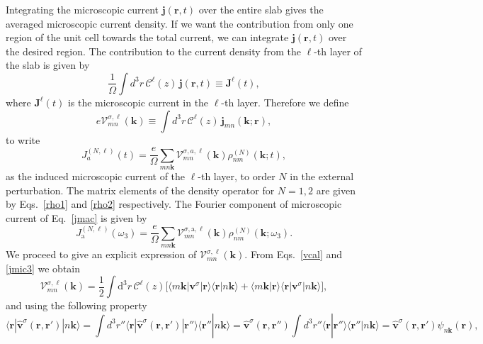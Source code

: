 Integrating the microscopic current $\mathbf{j}(\mathbf{r},t)$ over
the entire slab gives the averaged microscopic current density. 
If we want the contribution from only one region of the unit cell 
towards the total current, we can integrate $\mathbf{j}({\mathbf r},t)$ 
over the desired region. The contribution to the current density from the
$\ell$-th layer of the slab is given by
\begin{equation}\label{jsz}
\frac{1}{\Omega}\int d^3r\, \mathcal{C}^{\ell}(z)\, \mathbf{j}(\mathbf{r},t)
 \equiv \mathbf{J}^{\ell}(t),
\end{equation}
where $\mathbf{J}^{\ell}(t)$ is the microscopic current in the
$\ell$-th layer.
Therefore we define
\begin{equation}\label{vcal}
e{\boldsymbol{\mathcal{V}}}^{\sigma,\ell}_{mn}(\mathbf{k})
\equiv
\int d^3r\, \mathcal{C}^{\ell}(z)\,\mathbf{j}_{mn}({\mathbf{k}};\mathbf{r}),
\end{equation}
to write
\begin{equation}\label{jmac}
J_a^{(N,\ell)}(t)=\frac{e}{\Omega}
\sum_{mn\mathbf{k}}
\mathcal{V}^{\sigma,a,\ell}_{mn}(\mathbf{k})
\rho^{(N)}_{nm}(\mathbf{k};t),
\end{equation}
as the induced microscopic current of the $\ell$-th layer, to order $N$ 
in the external perturbation. The matrix elements of the 
density operator for $N=1,2$ are given by Eqs.~\eqref{rho1} and
\eqref{rho2} respectively. 
The Fourier component of microscopic current of Eq.~\eqref{jmac} is given by
\begin{equation}\label{jmac2}
J_{\mathrm{a}}^{(N,\ell)}(\omega_3)=\frac{e}{\Omega}
\sum_{mn\mathbf{k}}
\mathcal{V}^{\sigma,\mathrm{a},\ell}_{mn}(\mathbf{k})
\rho^{(N)}_{nm}(\mathbf{k};\omega_3)
.
\end{equation}
We proceed to give an explicit expression of
$\boldsymbol{\mathcal{V}}^{\sigma,\ell}_{mn}(\mathbf{k})$.
From
Eqs.~\eqref{vcal} and \eqref{jmic3} we obtain
\begin{equation}\label{intj}
{\boldsymbol{\mathcal{V}}}^{\sigma,\ell}_{mn}({\mathbf k})=
\frac{1}{2}
\int \mathrm{d}^3 r\,
 \mathcal{C}^{\ell}(z)
\bigg[
\langle m\mathbf{k}|\mathbf{v}^\sigma | \mathbf{r}\rangle
\langle \mathbf{r} | n \mathbf k \rangle +
\langle m\mathbf{k} | \mathbf{r}\rangle
\langle \mathbf{r} | \mathbf{v}^\sigma | n \mathbf k \rangle\bigg]
,
\end{equation}  
and using the following property
\begin{equation}\label{nl.2}
\langle \mathbf{r} | \hat{\mathbf{v}}^{\sigma}(\mathbf{r},\mathbf{r}')| n\mathbf{k} \rangle
=\int d^3 r'' \langle\mathbf{r}|\hat{\mathbf{v}}^{\sigma}(\mathbf{r},\mathbf{r}')|\mathbf{r}''\rangle
\langle\mathbf{r}''|n\mathbf{k}\rangle
=\hat{\mathbf{v}}^{\sigma}(\mathbf{r},\mathbf{r}'')
\int d^3 r'' \langle\mathbf{r}|\mathbf{r}''\rangle
\langle\mathbf{r}''|n\mathbf{k}\rangle
=\hat{\mathbf{v}}^{\sigma}(\mathbf{r},\mathbf{r}')
\psi_{n\mathbf{k}}(\mathbf{r})
,
\end{equation}

